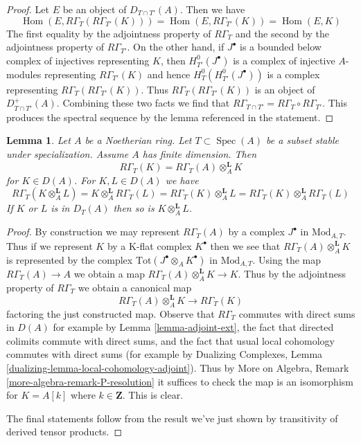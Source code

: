 \documentclass{stacks-project}
\theoremstyle{plain}
\newtheorem{lemma}[subsection]{Lemma}
\theoremstyle{definition}
\theoremstyle{remark}
\numberwithin{equation}{subsection}
\def\Spec{\mathop{\mathrm{Spec}}}
\def\Hom{\mathop{\mathrm{Hom}}\nolimits}
\begin{document}
\begin{proof}
Let $E$ be an object of $D_{T \cap T'}(A)$. Then we have
$$
\Hom(E, R\Gamma_T(R\Gamma_{T'}(K))) =
\Hom(E, R\Gamma_{T'}(K)) =
\Hom(E, K)
$$
The first equality by the adjointness property of $R\Gamma_T$
and the second by the adjointness property of $R\Gamma_{T'}$.
On the other hand, if $J^\bullet$ is a bounded below complex
of injectives representing $K$, then $H^0_{T'}(J^\bullet)$
is a complex of injective $A$-modules representing $R\Gamma_{T'}(K)$
and hence $H^0_T(H^0_{T'}(J^\bullet))$ is a complex representing
$R\Gamma_T(R\Gamma_{T'}(K))$. Thus $R\Gamma_T(R\Gamma_{T'}(K))$
is an object of $D^+_{T \cap T'}(A)$. Combining these two
facts we find that $R\Gamma_{T \cap T'} = R\Gamma_T \circ R\Gamma_{T'}$.
This produces the spectral sequence by the lemma referenced
in the statement.
\end{proof}

\begin{lemma}
\label{lemma-torsion-tensor-product}
Let $A$ be a Noetherian ring. Let $T \subset \Spec(A)$ be a subset
stable under specialization. Assume $A$ has finite dimension. Then
$$
R\Gamma_T(K) = R\Gamma_T(A) \otimes_A^\mathbf{L} K
$$
for $K \in D(A)$. For $K, L \in D(A)$ we have
$$
R\Gamma_T(K \otimes_A^\mathbf{L} L) =
K \otimes_A^\mathbf{L} R\Gamma_T(L) =
R\Gamma_T(K) \otimes_A^\mathbf{L} L =
R\Gamma_T(K) \otimes_A^\mathbf{L} R\Gamma_T(L)
$$
If $K$ or $L$ is in $D_T(A)$ then so is $K \otimes_A^\mathbf{L} L$.
\end{lemma}

\begin{proof}
By construction we may represent $R\Gamma_T(A)$ by a complex $J^\bullet$ in
$\text{Mod}_{A, T}$. Thus if we represent $K$ by a K-flat complex $K^\bullet$
then we see that $R\Gamma_T(A) \otimes_A^\mathbf{L} K$ is represented
by the complex $\text{Tot}(J^\bullet \otimes_A K^\bullet)$ in
$\text{Mod}_{A, T}$. Using the map $R\Gamma_T(A) \to A$ we obtain
a map $R\Gamma_T(A) \otimes_A^\mathbf{L} K\to K$. Thus by the adjointness
property of $R\Gamma_T$ we obtain a canonical map
$$
R\Gamma_T(A) \otimes_A^\mathbf{L} K \longrightarrow R\Gamma_T(K)
$$
factoring the just constructed map. Observe that $R\Gamma_T$ commutes
with direct sums in $D(A)$ for example by Lemma \ref{lemma-adjoint-ext},
the fact that directed colimits commute with direct sums, and the
fact that usual local cohomology commutes with direct sums
(for example by Dualizing Complexes, Lemma
\ref{dualizing-lemma-local-cohomology-adjoint}).
Thus by More on Algebra, Remark \ref{more-algebra-remark-P-resolution}
it suffices to check the map is an isomorphism for
$K = A[k]$ where $k \in \mathbf{Z}$. This is clear.

\medskip\noindent
The final statements follow from the result we've just shown
by transitivity of derived tensor products.
\end{proof}
\end{document}
